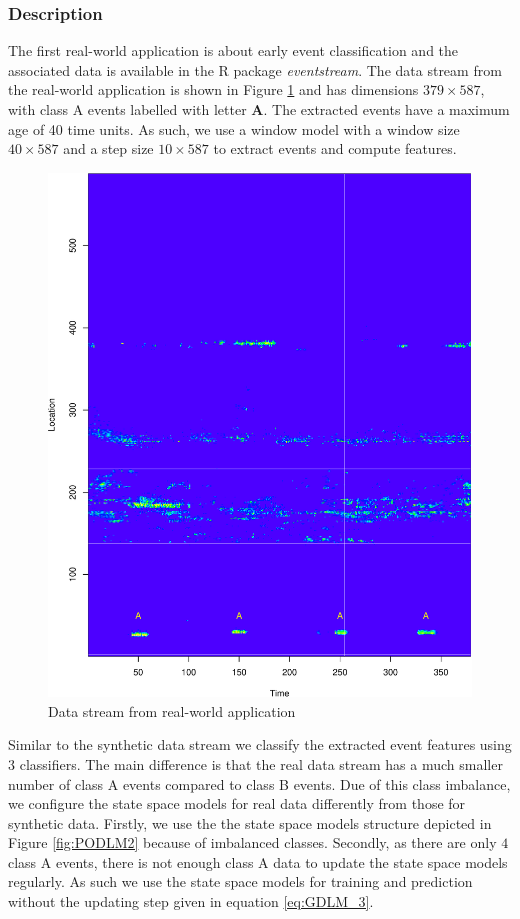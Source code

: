 \documentclass[11pt]{article}
\begin{document}
	\subsubsection{Description}
 	The first real-world application is about early event classification and the associated data is available in the R package {\it eventstream}. The data stream from the real-world application is shown in Figure \ref{fig:Real_World_Data_Stream}  and has dimensions $379  \times 587 $, with class A events labelled with letter {\bf A}. The extracted events have a maximum age of 40 time units. As such, we use a window model with a window size $40 \times 587$ and a step size $ 10 \times 587$ to extract events and compute features. 
 	\begin{figure}[!ht]
 		\centering
 		\includegraphics[scale=0.5]{./Graphics/Real_World_stream.pdf} 
 		\caption{\footnotesize Data stream from real-world application}
 		\label{fig:Real_World_Data_Stream}
 	\end{figure}
 	
 	Similar to the synthetic data stream we classify the extracted event features using 3 classifiers. The main difference is that the real data stream has a much smaller number of class A events compared to class B events.  Due of this class imbalance, we configure the state space models for real data differently from  those for synthetic data.  Firstly, we use the the state space models structure depicted in Figure \ref{fig:PODLM2} because of imbalanced classes. Secondly, as there are only $4$ class A events, there is not enough class A data to update the state space models regularly. As such we use the state space models for training and prediction without the updating step given in equation \eqref{eq:GDLM_3}. 
 	
\end{document}
